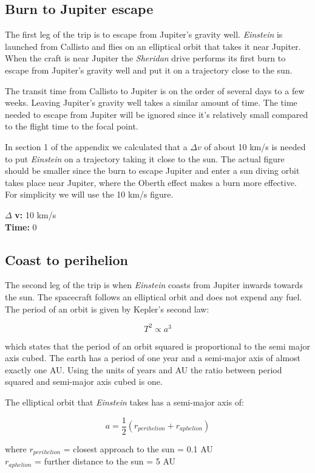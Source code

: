\documentclass[12pt]{article} %
\begin{document}
\subsection{Burn to Jupiter escape}
The first leg of the trip is to escape from Jupiter's gravity well. \textit{Einstein} is launched from Callisto and flies on an elliptical orbit that takes it near Jupiter. When the craft is near Jupiter the \textit{Sheridan} drive performs its first burn to escape from Jupiter's gravity well and put it on a trajectory close to the sun.

The transit time from Callisto to Jupiter is on the order of several days to a few weeks. Leaving Jupiter's gravity well takes a similar amount of time. The time needed to escape from Jupiter will be ignored since it's relatively small compared to the flight time to the focal point.

In section 1 of the appendix we calculated that a $\Delta v$ of about 10 km/s is needed to put \textit{Einstein} on a trajectory taking it close to the sun. The actual figure should be smaller since the burn to escape Jupiter and enter a sun diving orbit takes place near Jupiter, where the Oberth effect makes a burn more effective. For simplicity we will use the 10 km/s figure.

$\Delta$ \textbf{v:} 10 km/s\\
\textbf{Time:} 0

\subsection{Coast to perihelion}
The second leg of the trip is when \textit{Einstein} coasts from Jupiter inwards towards the sun. The spacecraft follows an elliptical orbit and does not expend any fuel. The period of an orbit is given by Kepler's second law:

$$T^2 \propto a^3$$

which states that the period of an orbit squared is proportional to the semi major axis cubed. The earth has a period of one year and a semi-major axis of almost exactly one AU. Using the units of years and AU the ratio between period squared and semi-major axis cubed is one.

The elliptical orbit that \textit{Einstein} takes has a semi-major axis of:

$$a = \frac{1}{2}(r_{perihelion} + r_{aphelion})$$

where
$r_{perihelion}$ = closest approach to the sun = 0.1 AU\\
$r_{aphelion}$ = further distance to the sun = 5 AU\\
\end{document}
